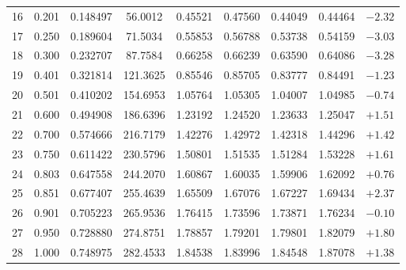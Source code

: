\documentclass[11pt,a4paper]{article}
\begin{document}
\begin{center}
\begin{tabular}{rcccccccr}
16 & 0.201 & 0.148497 & 56.0012 & 0.45521 & 0.47560 & 0.44049 & 0.44464 & $-2.32$ \\
17 & 0.250 & 0.189604 & 71.5034 & 0.55853 & 0.56788 & 0.53738 & 0.54159 & $-3.03$ \\
18 & 0.300 & 0.232707 & 87.7584 & 0.66258 & 0.66239 & 0.63590 & 0.64086 & $-3.28$ \\
19 & 0.401 & 0.321814 & 121.3625 & 0.85546 & 0.85705 & 0.83777 & 0.84491 & $-1.23$ \\
20 & 0.501 & 0.410202 & 154.6953 & 1.05764 & 1.05305 & 1.04007 & 1.04985 & $-0.74$ \\
21 & 0.600 & 0.494908 & 186.6396 & 1.23192 & 1.24520 & 1.23633 & 1.25047 & $+1.51$ \\
22 & 0.700 & 0.574666 & 216.7179 & 1.42276 & 1.42972 & 1.42318 & 1.44296 & $+1.42$ \\
23 & 0.750 & 0.611422 & 230.5796 & 1.50801 & 1.51535 & 1.51284 & 1.53228 & $+1.61$ \\
24 & 0.803 & 0.647558 & 244.2070 & 1.60867 & 1.60035 & 1.59906 & 1.62092 & $+0.76$ \\
25 & 0.851 & 0.677407 & 255.4639 & 1.65509 & 1.67076 & 1.67227 & 1.69434 & $+2.37$ \\
26 & 0.901 & 0.705223 & 265.9536 & 1.76415 & 1.73596 & 1.73871 & 1.76234 & $-0.10$ \\
27 & 0.950 & 0.728880 & 274.8751 & 1.78857 & 1.79201 & 1.79801 & 1.82079 & $+1.80$ \\
28 & 1.000 & 0.748975 & 282.4533 & 1.84538 & 1.83996 & 1.84548 & 1.87078 & $+1.38$ \\
\bottomrule
\end{tabular}
\end{center}

\end{document}
